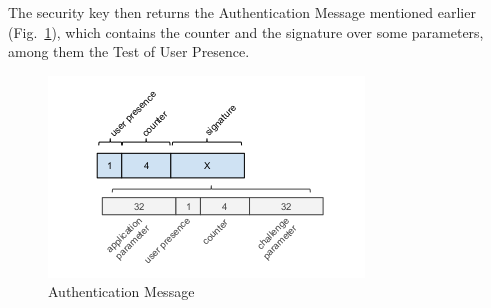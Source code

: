 The security key then returns the Authentication Message mentioned earlier (Fig.~\ref{fig:authentication-message}), which contains the counter and the signature over some parameters, among them the Test of User Presence.

\begin{figure}[h]
    \centering
    \includegraphics[width=0.5\linewidth]{resources/authentication-message.png}
    \caption{Authentication Message}
    \label{fig:authentication-message}
\end{figure}